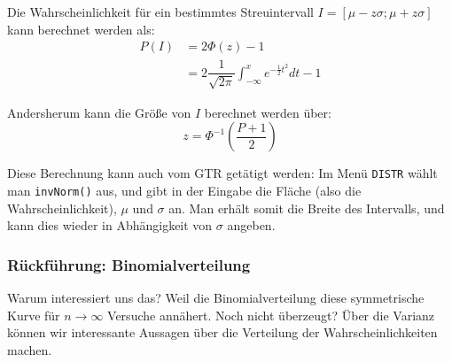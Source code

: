\documentclass[main.tex]{subfiles}
\begin{document}
\begin{Beweis}
  Die Wahrscheinlichkeit für ein bestimmtes Streuintervall $I=[\mu - z\sigma;\mu + z\sigma]$ kann berechnet werden als:
  \begin{align*}
    P(I) &= 2 \Phi(z)-1 \\
    &= 2 \dfrac{1}{\sqrt{2\pi}}\int_{-\infty}^{x} e^{-\frac{1}{2}t^2} dt -1
  \end{align*}
\end{Beweis}

\begin{Bemerkung}
  Andersherum kann die Größe von $I$ berechnet werden über:
  $$ z= \Phi^{-1} \left(\dfrac{P+1}{2}\right)$$
\end{Bemerkung}

\begin{GTR-Tipp}
  Diese Berechnung kann auch vom GTR getätigt werden: Im Menü \texttt{DISTR} wählt man \texttt{invNorm()} aus, und gibt in der Eingabe die Fläche (also die Wahrscheinlichkeit), $\mu$ und $\sigma$ an. Man erhält somit die Breite des Intervalls, und kann dies wieder in Abhängigkeit von $\sigma$ angeben.
\end{GTR-Tipp}



\subsubsection{Rückführung: Binomialverteilung}

Warum interessiert uns das? Weil die Binomialverteilung diese symmetrische Kurve für $n\rightarrow\infty$ Versuche annähert. Noch nicht überzeugt? Über die Varianz können wir interessante Aussagen über die Verteilung der Wahrscheinlichkeiten machen.
\end{document}

